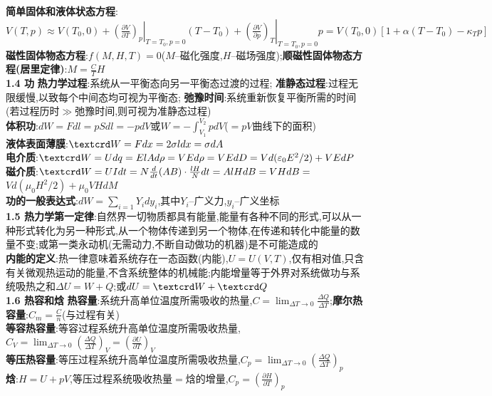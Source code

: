 \documentclass[10pt,a4paper]{article}
\begin{document}
\begin{multicols}{2}
\textbf{简单固体和液体状态方程}:$V(T,p)\approx V(T_0,0)+\left.\left(\frac{\partial V}{\partial T}\right)_p\right|_{T=T_0,p=0}(T-T_0)+\left.\left(\frac{\partial V}{\partial p}\right)_T\right|_{T=T_0,p=0}p=V(T_0,0)[1+\alpha(T-T_0)-\kappa_Tp]$\\
\textbf{磁性固体物态方程}:$f(M,H,T)=0$($M$--磁化强度,$H$--磁场强度);\textbf{顺磁性固体物态方程(居里定律)}:$M=\frac{C}{T}H$\\
\textbf{1.4 功}
\textbf{热力学过程}:系统从一平衡态向另一平衡态过渡的过程;
\textbf{准静态过程}:过程无限缓慢,以致每个中间态均可视为平衡态;
\textbf{弛豫时间}:系统重新恢复平衡所需的时间(若过程历时$\gg$弛豫时间,则可视为准静态过程)\\
\textbf{体积功}:$dW=Fdl=pSdl=-pdV$或$W=-\int_{V_1}^{V_2}pdV$($=pV$曲线下的面积)\\
\textbf{液体表面薄膜}:$\text{\textcrd}W=Fdx=2\sigma ldx=\sigma dA$\\
\textbf{电介质}:$\text{\textcrd}W=Udq=ElAd\rho=VEd\rho=VEdD=Vd({\varepsilon_0E^2}/{2})+VEdP$\\
\textbf{磁介质}:$\text{\textcrd}W=UIdt=N\frac{d}{dt}(AB)\cdot\frac{lH}{N}dt=AlHdB=VHdB=$$Vd({\mu_0H^2}/{2})+\mu_0VHdM$\\
\textbf{功的一般表达式}:$dW=\sum_{i=1}Y_idy_i$,其中$Y_i$--广义力,$y_i$--广义坐标\\
\textbf{1.5 热力学第一定律}:自然界一切物质都具有能量,能量有各种不同的形式,可以从一种形式转化为另一种形式,从一个物体传递到另一个物体,在传递和转化中能量的数量不变;或第一类永动机(无需动力,不断自动做功的机器)是不可能造成的\\
\textbf{内能的定义}:热一律意味着系统存在一态函数(内能),$U=U(V,T)$,仅有相对值,只含有关微观热运动的能量,不含系统整体的机械能;内能增量等于外界对系统做功与系统吸热之和$\Delta U=W+Q$;或$dU=\text{\textcrd}W+\text{\textcrd}Q$\\
\textbf{1.6 热容和焓}
\textbf{热容量}:系统升高单位温度所需吸收的热量,$C=\lim_{\Delta T\rightarrow0}\frac{\Delta Q}{\Delta T}$;\textbf{摩尔热容量}:$C_m=\frac{C}{n}$(与过程有关)\\
\textbf{等容热容量}:等容过程系统升高单位温度所需吸收热量,$C_V=\lim_{\Delta T\rightarrow0}\left(\frac{\Delta Q}{\Delta T}\right)_V=\left(\frac{\partial U}{\partial T}\right)_V$\\
\textbf{等压热容量}:等压过程系统升高单位温度所需吸收热量,$C_p=\lim_{\Delta T\rightarrow0}\left(\frac{\Delta Q}{\Delta T}\right)_p$\\
\textbf{焓}:$H=U+pV$,等压过程系统吸收热量$=$焓的增量,$C_p=\left(\frac{\partial H}{\partial T}\right)_p$\\
$$
\end{multicols}
\end{document}
